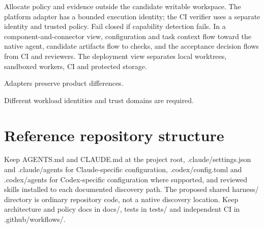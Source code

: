 \documentclass[11pt,letterpaper]{article}
\begin{document}
Allocate policy and evidence outside the candidate writable workspace. The platform adapter has a bounded execution identity; the CI verifier uses a separate identity and trusted policy. Fail closed if capability detection fails. In a component-and-connector view, configuration and task context flow toward the native agent, candidate artifacts flow to checks, and the acceptance decision flows from CI and reviewers. The deployment view separates local worktrees, sandboxed workers, CI and protected storage.

\begin{center}\begin{minipage}{\linewidth}\captionsetup{type=figure}\centering{}\caption{Cross-platform outer harness architecture}
\small Adapters preserve product differences.\end{minipage}\end{center}
\begin{center}\begin{minipage}{\linewidth}\captionsetup{type=figure}\centering{}\caption{Harness deployment architecture}
\small Different workload identities and trust domains are required.\end{minipage}\end{center}
\section{Reference repository structure}
Keep AGENTS.md and CLAUDE.md at the project root, .claude/settings.json and .claude/agents for Claude-specific configuration, .codex/config.toml and .codex/agents for Codex-specific configuration where supported, and reviewed skills installed to each documented discovery path. The proposed shared harness/ directory is ordinary repository code, not a native discovery location. Keep architecture and policy docs in docs/, tests in tests/ and independent CI in .github/workflows/.
\end{document}

